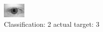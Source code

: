 \begin{figure}[h!]
\begin{center}
\includegraphics[width=0.60\columnwidth]{figures/ID619_class_2_target_3.png}
\end{center}
\caption{ Classification: 2 actual target: 3}
\label{fig:ID619_class_2_target_3}
\end{figure}
